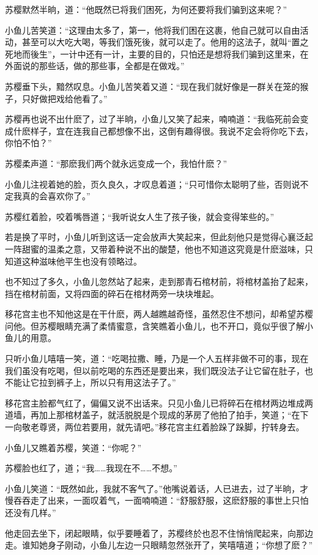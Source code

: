 \documentclass[12pt,oneside]{book}
\begin{document}
苏樱默然半晌，道：``他既然已将我们困死，为何还要将我们骗到这来呢？''

小鱼儿苦笑道：``这理由太多了，第一，他将我们困在这裹，他自己就可以自由活动，甚至可以大吃大喝，等我们饿死後，就可以走了。他用的这法子，就叫``置之死地而後生''，一计中还有一计，主要的目的，只怕还是想将我们骗到这里来，在外面说的那些话，做的那些事，全都是在做戏。''

苏樱垂下头，黯然叹息。小鱼儿苦笑着又道：``现在我们就好像是一群关在笼的猴子，只好做把戏给他看了。''

苏樱再也说不出什麽了，过了半晌，小鱼儿又笑了起来，喃喃道：``我临死前会变成什麽样子，宜在连我自己都想像不出，这倒有趣得很。我说不定会将你吃下去，你怕不怕？''

苏樱柔声道：``那麽我们两个就永远变成一个，我怕什麽？''

小鱼儿注视着她的脸，页久良久，才叹息着道；``只可惜你太聪明了些，否则说不定我真的会喜欢你了。''

苏樱红着脸，咬着嘴唇道；``我听说女人生了孩子後，就会变得笨些的。''

若是换了平时，小鱼儿听到这话一定会放声大笑起来，但此刻他只是觉得心襄泛起一阵甜蜜的温柔之意，又带着种说不出的酸楚，他也不知道这究竟是什麽滋味，只知道这种滋味他平生也没有领略过。

也不知过了多久，小鱼儿忽然站了起来，走到那青石棺材前，将棺材盖抬了起来，挡在棺材前面，又将四面的碎石在棺材两旁一块块堆起。

移花宫主也不知他这是在干什麽，两人越瞧越奇怪，虽然忍住不想问，却希望苏樱问他。但苏樱眼睛充满了柔情蜜意，含笑瞧着小鱼儿，也不开口，竟似乎很了解小鱼儿的用意。

只听小鱼儿嘻嘻一笑，道：``吃喝拉撒、睡，乃是一个人五样非做不可的事，现在我们虽没有吃喝，但以前吃喝的东西还是要出来，我们既没法子让它留在肚子，也不能让它拉到裤子上，所以只有用这法子了。''

移花宫主脸都气红了，偏偏又说不出话来。只见小鱼儿已将碎石在棺材两边堆成两道墙，再加上那棺材盖子，就活脱脱是个现成的茅房了他拍了拍手，笑道；``在下一向敬老尊贤，两位若要用，就先请吧。''移花宫主红着脸跺了跺脚，拧转身去。

小鱼儿又瞧着苏樱，笑道：``你呢？''

苏樱脸也红了，道；``我\ldots\ldots 我现在不\ldots\ldots 不想。''

小鱼儿笑道：``既然如此，我就不客气了。''他嘴说着话，人已进去，过了半晌，才慢吞吞走了出来，一面叹着气，一面喃喃道：``舒服舒服，这麽舒服的事世上只怕还没有几样。''

他走回去坐下，闭起眼睛，似乎要睡着了，苏樱终於也忍不住悄悄爬起来，向那边走。谁知她身子刚动，小鱼儿左边一只眼睛忽然张开了，笑嘻嘻道；``你想了麽？''
\end{document}
